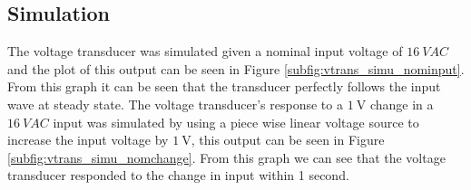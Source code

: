 \subsection{Simulation} \label{sec:vtrans_simu}
The voltage transducer was simulated given a nominal input voltage of $\SI{16}{VAC}$ and the plot of this output can be seen in Figure \ref{subfig:vtrans_simu_nominput}. From this graph it can be seen that the transducer perfectly follows the input wave at steady state. The voltage transducer's response to a $\SI{1}{\volt}$ change in a $\SI{16}{VAC}$ input was simulated by using a piece wise linear voltage source to increase the input voltage by $\SI{1}{\volt}$, this output can be seen in Figure \ref{subfig:vtrans_simu_nomchange}. From this graph we can see that the voltage transducer responded to the change in input within 1 second.


